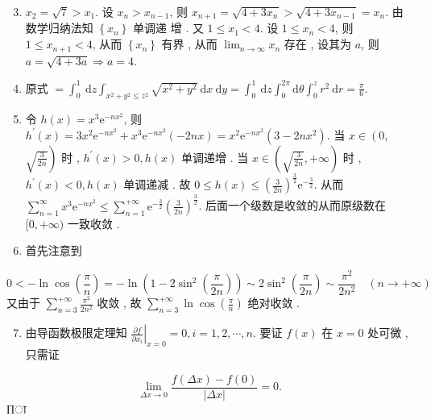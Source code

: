 \documentclass[10pt]{article}
\begin{document}
\begin{enumerate}
  \setcounter{enumi}{2}
  \item $x_{2}=\sqrt{7}>x_{1}$.  设  $x_{n}>x_{n-1}$,  则  $x_{n+1}=\sqrt{4+3 x_{n}}>\sqrt{4+3 x_{n-1}}=x_{n}$.  由数学归纳法知  $\left\{x_{n}\right\}$  单调递   增 .  又  $1 \leq x_{1}<4$.  设  $1 \leq x_{n}<4$,  则  $1 \leq x_{n+1}<4$,  从而  $\left\{x_{n}\right\}$  有界 ,  从而  $\lim _{n \rightarrow \infty} x_{n}$  存在 ,  设其为  $a$,  则  $a=\sqrt{4+3 a} \Longrightarrow a=4$.

  \item  原式  $=\int_{0}^{1} \mathrm{~d} z \int_{x^{2}+y^{2} \leq z^{2}} \sqrt{x^{2}+y^{2}} \mathrm{~d} x \mathrm{~d} y=\int_{0}^{1} \mathrm{~d} z \int_{0}^{2 \pi} \mathrm{d} \theta \int_{0}^{z} r^{2} \mathrm{~d} r=\frac{\pi}{6}$.

  \item  令  $h(x)=x^{3} \mathrm{e}^{-n x^{2}}$,  则  $h^{\prime}(x)=3 x^{2} \mathrm{e}^{-n x^{2}}+x^{3} \mathrm{e}^{-n x^{2}}(-2 n x)=x^{2} \mathrm{e}^{-n x^{2}}\left(3-2 n x^{2}\right)$.  当  $x \in\left(0\right.$, $\left.\sqrt{\frac{3}{2 n}}\right)$  时 , $h^{\prime}(x)>0, h(x)$  单调递增 .  当  $x \in\left(\sqrt{\frac{3}{2 n}},+\infty\right)$  时 , $h^{\prime}(x)<0, h(x)$  单调递减 .  故  $0 \leq h(x) \leq\left(\frac{3}{2 n}\right)^{\frac{3}{2}} \mathrm{e}^{-\frac{3}{2}}$.  从而  $\sum_{n=1}^{\infty} x^{3} \mathrm{e}^{-n x^{2}} \leq \sum_{n=1}^{+\infty} \mathrm{e}^{-\frac{3}{2}}\left(\frac{3}{2 n}\right)^{\frac{3}{2}}$.  后面一个级数是收敛的从而原级数在  $[0,+\infty)$  一致收敛 .

  \item  首先注意到 

\end{enumerate}
$$
0<-\ln \cos \left(\frac{\pi}{n}\right)=-\ln \left(1-2 \sin ^{2}\left(\frac{\pi}{2 n}\right)\right) \sim 2 \sin ^{2}\left(\frac{\pi}{2 n}\right) \sim \frac{\pi^{2}}{2 n^{2}} \quad(n \rightarrow+\infty)
$$
 又由于  $\sum_{n=3}^{+\infty} \frac{\pi^{2}}{2 n^{2}}$  收敛 ,  故  $\sum_{n=3}^{+\infty} \ln \cos \left(\frac{\pi}{n}\right)$  绝对收敛 .

\begin{enumerate}
  \setcounter{enumi}{6}
  \item  由导函数极限定理知  $\left.\frac{\partial f}{\partial x_{i}}\right|_{x=0}=0, i=1,2, \cdots, n$.  要证  $f(x)$  在  $x=0$  处可微 ,  只需证 
\end{enumerate}
$$
\lim _{\Delta x \rightarrow 0} \frac{f(\Delta x)-f(0)}{|\Delta x|}=0 .
$$
Пा
\end{document}
